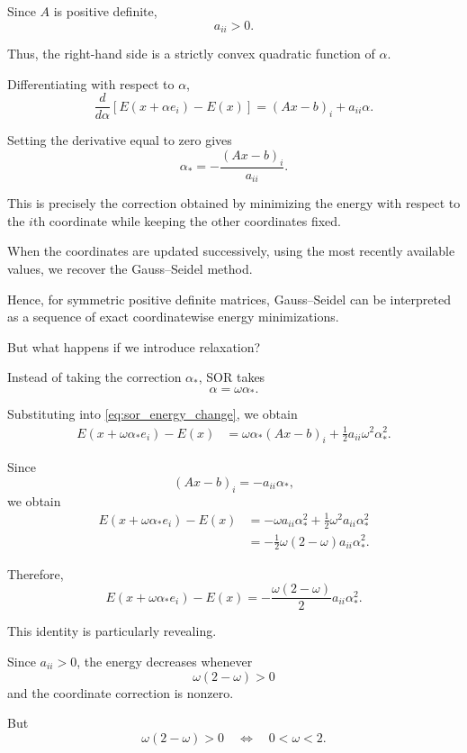 \documentclass[11pt,a4paper]{article}
\theoremstyle{definition}
\theoremstyle{remark}
\begin{document}
Since $A$ is positive definite,
\[
    a_{ii}>0.
\]

Thus, the right-hand side is a strictly convex
quadratic function of $\alpha$.

Differentiating with respect to $\alpha$,
\[
    \frac{d}{d\alpha}
    \left[
    E(x+\alpha e_i)-E(x)
    \right]
    =
    (Ax-b)_i+a_{ii}\alpha.
\]

Setting the derivative equal to zero gives
\[
    \boxed{
    \alpha_*=
    -\frac{(Ax-b)_i}{a_{ii}}.
    }
\]

This is precisely the correction obtained by
minimizing the energy with respect to the
$i$th coordinate while keeping the other
coordinates fixed.

When the coordinates are updated successively,
using the most recently available values,
we recover the Gauss--Seidel method.

Hence, for symmetric positive definite matrices,
Gauss--Seidel can be interpreted as a sequence
of exact coordinatewise energy minimizations.

But what happens if we introduce relaxation?

Instead of taking the correction $\alpha_*$,
SOR takes
\[
    \alpha=\omega\alpha_*.
\]

Substituting into
\eqref{eq:sor_energy_change}, we obtain
\[
\begin{aligned}
E(x+\omega\alpha_*e_i)-E(x)
&=
\omega\alpha_*(Ax-b)_i
+\frac12a_{ii}\omega^2\alpha_*^2.
\end{aligned}
\]

Since
\[
    (Ax-b)_i=-a_{ii}\alpha_*,
\]
we obtain
\[
\begin{aligned}
E(x+\omega\alpha_*e_i)-E(x)
&=
-\omega a_{ii}\alpha_*^2
+\frac12\omega^2a_{ii}\alpha_*^2
\\
&=
-\frac12\omega(2-\omega)
a_{ii}\alpha_*^2.
\end{aligned}
\]

Therefore,
\begin{equation}
    \boxed{
    E(x+\omega\alpha_*e_i)-E(x)
    =
    -\frac{\omega(2-\omega)}{2}
    a_{ii}\alpha_*^2.
    }
    \label{eq:sor_energy_decrease}
\end{equation}

This identity is particularly revealing.

Since $a_{ii}>0$, the energy decreases whenever
\[
    \omega(2-\omega)>0
\]
and the coordinate correction is nonzero.

But
\[
    \omega(2-\omega)>0
    \quad\Longleftrightarrow\quad
    0<\omega<2.
\]
\end{document}
